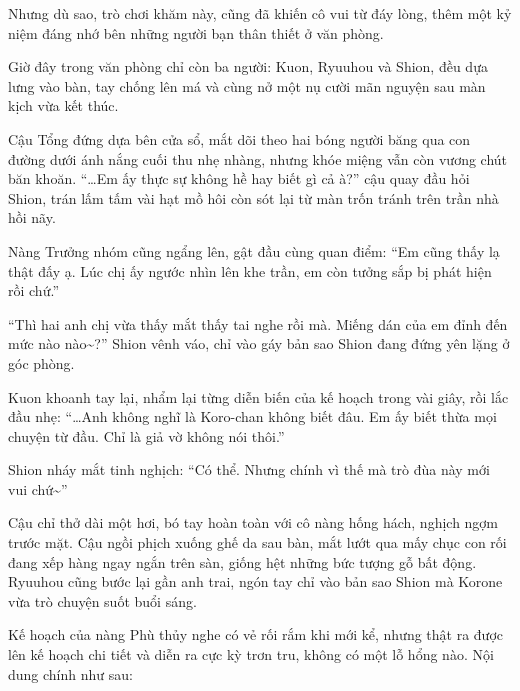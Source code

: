 \documentclass[../main.tex]{subfiles}
\begin{document}
Nhưng dù sao, trò chơi khăm này, cũng đã khiến cô vui từ đáy lòng, thêm một kỷ niệm đáng nhớ bên những người bạn thân thiết ở văn phòng.

\omk

Giờ đây trong văn phòng chỉ còn ba người: Kuon, Ryuuhou và Shion, đều dựa lưng vào bàn, tay chống lên má và cùng nở một nụ cười mãn nguyện sau màn kịch vừa kết thúc.

Cậu Tổng đứng dựa bên cửa sổ, mắt dõi theo hai bóng người băng qua con đường dưới ánh nắng cuối thu nhẹ nhàng, nhưng khóe miệng vẫn còn vương chút băn khoăn. ``\dots Em ấy thực sự không hề hay biết gì cả à?'' cậu quay đầu hỏi Shion, trán lấm tấm vài hạt mồ hôi còn sót lại từ màn trốn tránh trên trần nhà hồi nãy.

Nàng Trưởng nhóm cũng ngẩng lên, gật đầu cùng quan điểm: ``Em cũng thấy lạ thật đấy ạ. Lúc chị ấy ngước nhìn lên khe trần, em còn tưởng sắp bị phát hiện rồi chứ.''

``Thì hai anh chị vừa thấy mắt thấy tai nghe rồi mà. Miếng dán của em đỉnh đến mức nào nào\~{}?'' Shion vênh váo, chỉ vào gáy bản sao Shion đang đứng yên lặng ở góc phòng.

Kuon khoanh tay lại, nhẩm lại từng diễn biến của kế hoạch trong vài giây, rồi lắc đầu nhẹ: ``\dots Anh không nghĩ là Koro-chan không biết đâu. Em ấy biết thừa mọi chuyện từ đầu. Chỉ là giả vờ không nói thôi.''

Shion nháy mắt tinh nghịch: ``Có thể. Nhưng chính vì thế mà trò đùa này mới vui chứ\~{}''

Cậu chỉ thở dài một hơi, bó tay hoàn toàn với cô nàng hống hách, nghịch ngợm trước mặt. Cậu ngồi phịch xuống ghế da sau bàn, mắt lướt qua mấy chục con rối đang xếp hàng ngay ngắn trên sàn, giống hệt những bức tượng gỗ bất động. Ryuuhou cũng bước lại gần anh trai, ngón tay chỉ vào bản sao Shion mà Korone vừa trò chuyện suốt buổi sáng.

Kế hoạch của nàng Phù thủy nghe có vẻ rối rắm khi mới kể, nhưng thật ra được lên kế hoạch chi tiết và diễn ra cực kỳ trơn tru, không có một lỗ hổng nào. Nội dung chính như sau:
\end{document}
